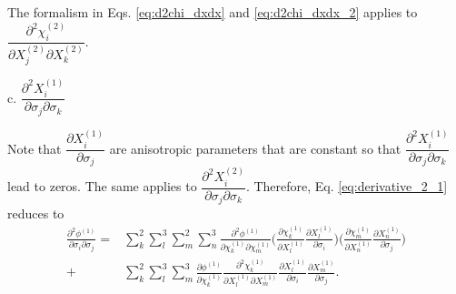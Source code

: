 \documentclass[12pt]{amsart}
\begin{document}
The formalism in Eqs. \ref{eq:d2chi_dxdx} and \ref{eq:d2chi_dxdx_2} applies to $\dfrac{\partial^2\chi_i^{(2)}}{\partial X_j^{(2)} \partial X_k^{(2)}}$.


c. $\dfrac{\partial^2 X^{(1)}_i}{\partial\sigma_j\partial\sigma_k}$

Note that $\dfrac{\partial X^{(1)}_i}{\partial\sigma_j}$ are anisotropic parameters that are constant so that $\dfrac{\partial^2 X^{(1)}_i}{\partial\sigma_j\partial\sigma_k}$ lead to zeros.
The same applies to $\dfrac{\partial^2 X^{(2)}_i}{\partial\sigma_j\partial\sigma_k}$.
Therefore, Eq. \ref{eq:derivative_2_1} reduces to
\begin{equation}
  \label{eq:derivative_2_5}
  \begin{split}
    \frac{\partial^2\phi^{(1)}}{\partial\sigma_i\partial\sigma_j}=&\sum_k^2 \sum_l^3 \sum_m^2 \sum_n^3 \frac{\partial^2\phi^{(1)}}{\partial\chi^{(1)}_k\partial\chi^{(1)}_m} \bigg( \frac{\partial\chi^{(1)}_k}{\partial X^{(1)}_l}    \frac{\partial X^{(1)}_l}{\partial \sigma_i}\bigg)  \bigg( \frac{\partial\chi^{(1)}_m}{\partial X^{(1)}_n}    \frac{\partial X^{(1)}_n}{\partial \sigma_j}\bigg)\\
    +&\sum_k^2 \sum_l^3 \sum_m^3 \frac{\partial\phi^{(1)} }{\partial\chi^{(1)}_k}     \frac{\partial^2\chi^{(1)}_k}{\partial X^{(1)}_l \partial  X^{(1)}_m}   \frac{\partial X^{(1)}_l}{\partial\sigma_i}    \frac{\partial X^{(1)}_m}{\partial\sigma_j}.
  \end{split}
\end{equation}

\newpage



\end{document}
